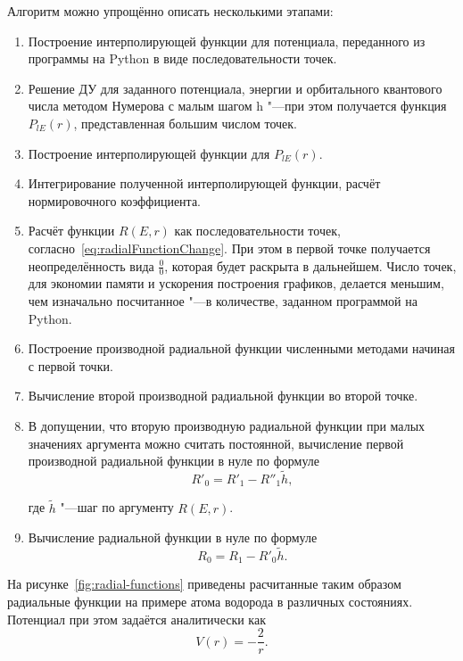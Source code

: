 Алгоритм можно упрощённо описать несколькими этапами:
\begin{enumerate}
    \item Построение интерполирующей функции для потенциала, переданного из программы на Python в виде
    последовательности точек.
    \item Решение ДУ для заданного потенциала, энергии и орбитального квантового числа методом Нумерова с малым шагом h
    "---при этом получается функция $P_{l E}(r)$, представленная большим числом точек.
    \item Построение интерполирующей функции для $P_{l E}(r)$.
    \item Интегрирование полученной интерполирующей функции, расчёт нормировочного коэффициента.
    \item Расчёт функции $R(E, r)$ как последовательности точек, согласно~\eqref{eq:radialFunctionChange}. При этом в
    первой точке получается неопределённость вида $\frac{0}{0}$, которая будет раскрыта в дальнейшем. Число точек,
    для экономии памяти и ускорения построения графиков, делается меньшим, чем изначально посчитанное "---в количестве,
    заданном программой на Python.
    \item Построение производной радиальной функции численными методами\cite{Fornberg1988GenerationOF} начиная с первой
    точки.
    \item Вычисление второй производной радиальной функции во второй точке.
    \item В допущении, что вторую производную радиальной функции при малых значениях аргумента можно считать постоянной,
    вычисление первой производной радиальной функции в нуле по формуле
    \begin{equation}
      R'_0 = R'_1 - R''_1 \tilde{h},
    \end{equation}

    где $\tilde{h}$ "---шаг по аргументу $R(E, r)$.

    \item Вычисление радиальной функции в нуле по формуле
    \begin{equation}
      R_0 = R_1 - R'_0 \tilde{h}.
    \end{equation}
\end{enumerate}

На рисунке~\cref{fig:radial-functions} приведены расчитанные таким образом радиальные функции на примере атома водорода
в различных состояниях. Потенциал при этом задаётся аналитически как
\begin{equation}
V(r) = -\frac{2}{r}.
\end{equation}

